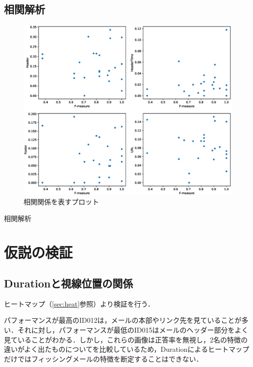 \documentclass[a4paper,11pt]{ltjsreport}
\begin{document}
\subsection{相関解析}
\begin{figure}[H]
	\centering
	\includegraphics[width=\textwidth]{img/output/scatter_plots.eps}
	\caption{相関関係を表すプロット\label{scat_plt}}
\end{figure}

\begin{table}[H]
	\centering
	\caption{相関解析\label{soukan}}
\end{table}

\section{仮説の検証}
\subsection{Durationと視線位置の関係}
ヒートマップ（\ref{sec:heat}参照）より検証を行う．

パフォーマンスが最高のID012は，メールの本部やリンク先を見ていることが多い．それに対し，パフォーマンスが最低のID015はメールのヘッダー部分をよく見ていることがわかる．しかし，これらの画像は正答率を無視し，2名の特徴の違いがよく出たものについてを比較しているため，Durationによるヒートマップだけではフィッシングメールの特徴を断定することはできない．
\end{document}
